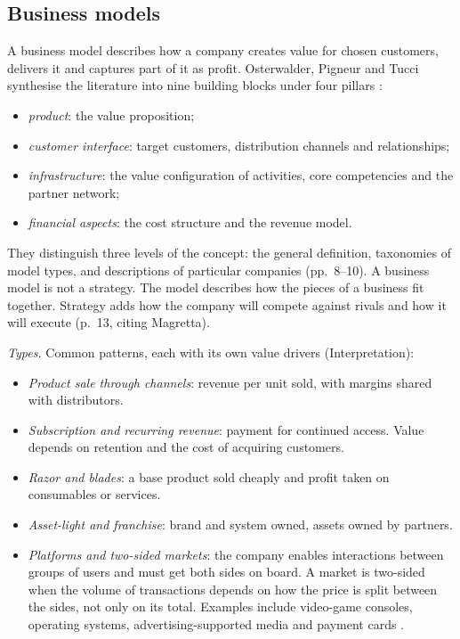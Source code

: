 \subsection{Business models}

\begin{qfdefinition}\label{def:business-model-features-types}
 A business model describes how a company creates value for chosen customers, delivers it and captures part of it as profit. Osterwalder, Pigneur and Tucci synthesise the literature into nine building blocks under four pillars \citep[pp.~17--18 and Table~3]{clarifying-business-models-2005}:
\begin{itemize}
\item \emph{product}: the value proposition;
\item \emph{customer interface}: target customers, distribution channels and relationships;
\item \emph{infrastructure}: the value configuration of activities, core competencies and the partner network;
\item \emph{financial aspects}: the cost structure and the revenue model.
\end{itemize}
They distinguish three levels of the concept: the general definition, taxonomies of model types, and descriptions of particular companies (pp.~8--10). A business model is not a strategy. The model describes how the pieces of a business fit together. Strategy adds how the company will compete against rivals and how it will execute (p.~13, citing Magretta).

\emph{Types.} Common patterns, each with its own value drivers (Interpretation):
\begin{itemize}
\item \emph{Product sale through channels}: revenue per unit sold, with margins shared with distributors.
\item \emph{Subscription and recurring revenue}: payment for continued access. Value depends on retention and the cost of acquiring customers.
\item \emph{Razor and blades}: a base product sold cheaply and profit taken on consumables or services.
\item \emph{Asset-light and franchise}: brand and system owned, assets owned by partners.
\item \emph{Platforms and two-sided markets}: the company enables interactions between groups of users and must get both sides on board. A market is two-sided when the volume of transactions depends on how the price is split between the sides, not only on its total. Examples include video-game consoles, operating systems, advertising-supported media and payment cards \citep[pp.~1--2]{two-sided-markets-2005}.
\end{itemize}


\end{qfdefinition}
